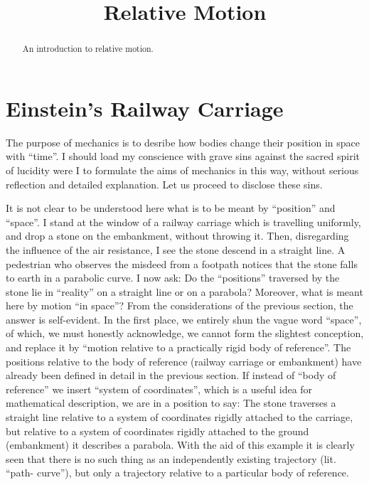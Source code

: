 \documentclass{ximera}
\title{Relative Motion}
\begin{document}
\begin{abstract}
An introduction to relative motion.
\end{abstract}
\maketitle

\section{Einstein's Railway Carriage}


The purpose of mechanics is to desribe how bodies change their position in space with ``time''. I should load my conscience with grave sins against the sacred spirit of lucidity were I to formulate the aims of mechanics in this way, without serious reflection and detailed explanation. Let us proceed to disclose these sins.

 It is not clear to be understood here what is to be meant by ``position'' and ``space''. I stand at the window of a railway carriage which is travelling uniformly, and drop a stone on the embankment, without throwing it. Then, disregarding the influence of the air resistance, I see the stone descend in a straight line. A pedestrian who observes the misdeed from a footpath notices that the stone falls to earth in a parabolic curve. I now ask: Do the ``positions'' traversed by the stone lie in ``reality'' on a straight line or on a parabola? Moreover, what is meant here by motion ``in space''? From the considerations of the previous section, the answer is self-evident. In the first place, we entirely shun the vague word ``space'', of which, we must honestly acknowledge, we cannot form the slightest conception, and replace it by ``motion relative to a practically rigid body of reference''. The positions relative to the body of reference (railway carriage or embankment) have already been defined in detail in the previous section. If instead of ``body of reference'' we insert ``system of coordinates'', which is a useful idea for mathematical description, we are in a position to say: The stone traverses a straight line relative to a system of coordinates rigidly attached to the carriage, but relative to a system of coordinates rigidly attached to the ground (embankment) it describes a parabola. With the aid of this example it is clearly seen that there is no such thing as an independently existing trajectory (lit. ``path- curve''), but only a trajectory relative to a particular body of reference. 
\end{document}
